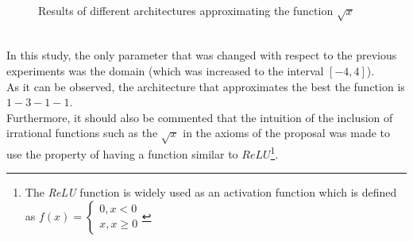 \documentclass[a4paper, 11pt]{article}
\begin{document}
\begin{figure}[h]
    \caption{Results of different architectures approximating the function $\sqrt{x}$}
    \label{sqrt100}
\end{figure}\\
In this study, the only parameter that was changed with respect to the previous experiments was the domain (which was increased to the interval $[-4,4]$).\\
As it can be observed, the architecture that approximates the best the function is $1-3-1-1$.\\
Furthermore, it should also be commented that the intuition of the inclusion of irrational functions such as the $\sqrt{x}$ in the axioms of the proposal was made to use the property of having a function similar to $ReLU$\footnote{The \textit{ReLU} function is widely used as an activation function which is defined as $f(x) = \left\{ \begin{matrix} 0, x < 0 \\ x, x\geq 0\end{matrix} \right.$}.\\
\end{document}
